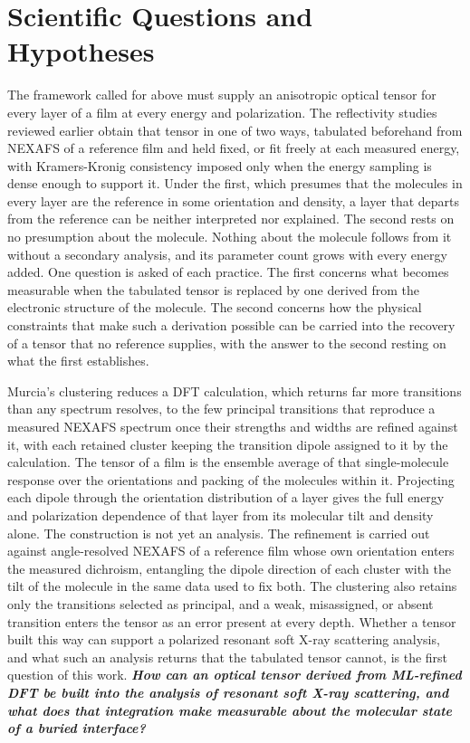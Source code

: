 \section{Scientific Questions and Hypotheses}\label{sec:scientific-questions-and-hypotheses}

The framework called for above must supply an anisotropic optical tensor for every layer of a film at every energy and polarization. The reflectivity studies reviewed earlier obtain that tensor in one of two ways, tabulated beforehand from NEXAFS of a reference film and held fixed, or fit freely at each measured energy, with Kramers-Kronig consistency imposed only when the energy sampling is dense enough to support it. Under the first, which presumes that the molecules in every layer are the reference in some orientation and density, a layer that departs from the reference can be neither interpreted nor explained. The second rests on no presumption about the molecule. Nothing about the molecule follows from it without a secondary analysis, and its parameter count grows with every energy added. One question is asked of each practice. The first concerns what becomes measurable when the tabulated tensor is replaced by one derived from the electronic structure of the molecule. The second concerns how the physical constraints that make such a derivation possible can be carried into the recovery of a tensor that no reference supplies, with the answer to the second resting on what the first establishes.

Murcia's clustering reduces a DFT calculation, which returns far more transitions than any spectrum resolves, to the few principal transitions that reproduce a measured NEXAFS spectrum once their strengths and widths are refined against it, with each retained cluster keeping the transition dipole assigned to it by the calculation. The tensor of a film is the ensemble average of that single-molecule response over the orientations and packing of the molecules within it. Projecting each dipole through the orientation distribution of a layer gives the full energy and polarization dependence of that layer from its molecular tilt and density alone. The construction is not yet an analysis. The refinement is carried out against angle-resolved NEXAFS of a reference film whose own orientation enters the measured dichroism, entangling the dipole direction of each cluster with the tilt of the molecule in the same data used to fix both. The clustering also retains only the transitions selected as principal, and a weak, misassigned, or absent transition enters the tensor as an error present at every depth. Whether a tensor built this way can support a polarized resonant soft X-ray scattering analysis, and what such an analysis returns that the tabulated tensor cannot, is the first question of this work. \emph{\textbf{How can an optical tensor derived from ML-refined DFT be built into the analysis of resonant soft X-ray scattering, and what does that integration make measurable about the molecular state of a buried interface?}}

